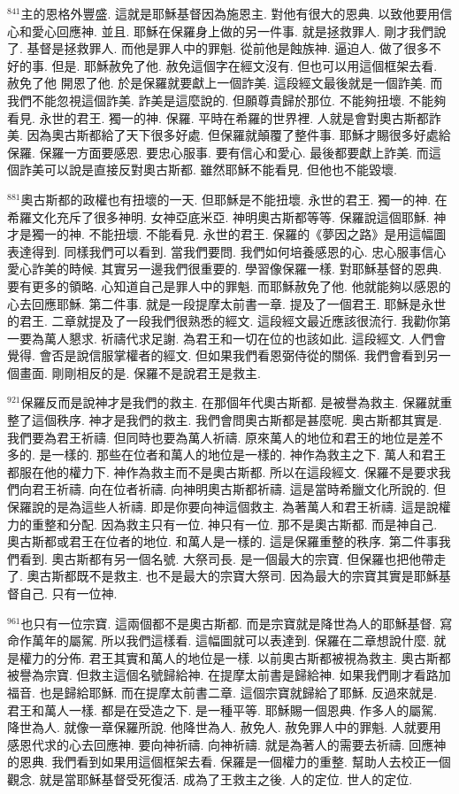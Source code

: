 \documentclass{book}
\begin{document}
$^{841}$主的恩格外豐盛.
這就是耶穌基督因為施恩主.
對他有很大的恩典.
以致他要用信心和愛心回應神.
並且.
耶穌在保羅身上做的另一件事.
就是拯救罪人.
剛才我們說了.
基督是拯救罪人.
而他是罪人中的罪魁.
從前他是蝕族神.
逼迫人.
做了很多不好的事.
但是.
耶穌赦免了他.
赦免這個字在經文沒有.
但也可以用這個框架去看.
赦免了他 開恩了他.
於是保羅就要獻上一個詐美.
這段經文最後就是一個詐美.
而我們不能忽視這個詐美.
詐美是這麼說的.
但願尊貴歸於那位.
不能夠扭壞.
不能夠看見.
永世的君王.
獨一的神.
保羅.
平時在希羅的世界裡.
人就是會對奧古斯都詐美.
因為奧古斯都給了天下很多好處.
但保羅就顛覆了整件事.
耶穌才賜很多好處給保羅.
保羅一方面要感恩.
要忠心服事.
要有信心和愛心.
最後都要獻上詐美.
而這個詐美可以說是直接反對奧古斯都.
雖然耶穌不能看見.
但他也不能毀壞.

$^{881}$奧古斯都的政權也有扭壞的一天.
但耶穌是不能扭壞.
永世的君王.
獨一的神.
在希羅文化充斥了很多神明.
女神亞底米亞.
神明奧古斯都等等.
保羅說這個耶穌.
神才是獨一的神.
不能扭壞.
不能看見.
永世的君王.
保羅的《夢因之路》是用這幅圖表達得到.
同樣我們可以看到.
當我們要問.
我們如何培養感恩的心.
忠心服事信心愛心詐美的時候.
其實另一邊我們很重要的.
學習像保羅一樣.
對耶穌基督的恩典.
要有更多的領略.
心知道自己是罪人中的罪魁.
而耶穌赦免了他.
他就能夠以感恩的心去回應耶穌.
第二件事.
就是一段提摩太前書一章.
提及了一個君王.
耶穌是永世的君王.
二章就提及了一段我們很熟悉的經文.
這段經文最近應該很流行.
我勸你第一要為萬人懇求.
祈禱代求足謝.
為君王和一切在位的也該如此.
這段經文.
人們會覺得.
會否是說信服掌權者的經文.
但如果我們看恩弼侍從的關係.
我們會看到另一個畫面.
剛剛相反的是.
保羅不是說君王是救主.

$^{921}$保羅反而是說神才是我們的救主.
在那個年代奧古斯都.
是被譽為救主.
保羅就重整了這個秩序.
神才是我們的救主.
我們會問奧古斯都是甚麼呢.
奧古斯都其實是.
我們要為君王祈禱.
但同時也要為萬人祈禱.
原來萬人的地位和君王的地位是差不多的.
是一樣的.
那些在位者和萬人的地位是一樣的.
神作為救主之下.
萬人和君王都服在他的權力下.
神作為救主而不是奧古斯都.
所以在這段經文.
保羅不是要求我們向君王祈禱.
向在位者祈禱.
向神明奧古斯都祈禱.
這是當時希臘文化所說的.
但保羅說的是為這些人祈禱.
即是你要向神這個救主.
為著萬人和君王祈禱.
這是說權力的重整和分配.
因為救主只有一位.
神只有一位.
那不是奧古斯都.
而是神自己.
奧古斯都或君王在位者的地位.
和萬人是一樣的.
這是保羅重整的秩序.
第二件事我們看到.
奧古斯都有另一個名號.
大祭司長.
是一個最大的宗寶.
但保羅也把他帶走了.
奧古斯都既不是救主.
也不是最大的宗寶大祭司.
因為最大的宗寶其實是耶穌基督自己.
只有一位神.

$^{961}$也只有一位宗寶.
這兩個都不是奧古斯都.
而是宗寶就是降世為人的耶穌基督.
寫命作萬年的屬駕.
所以我們這樣看.
這幅圖就可以表達到.
保羅在二章想說什麼.
就是權力的分佈.
君王其實和萬人的地位是一樣.
以前奧古斯都被視為救主.
奧古斯都被譽為宗寶.
但救主這個名號歸給神.
在提摩太前書是歸給神.
如果我們剛才看路加福音.
也是歸給耶穌.
而在提摩太前書二章.
這個宗寶就歸給了耶穌.
反過來就是.
君王和萬人一樣.
都是在受造之下.
是一種平等.
耶穌賜一個恩典.
作多人的屬駕.
降世為人.
就像一章保羅所說.
他降世為人.
赦免人.
赦免罪人中的罪魁.
人就要用感恩代求的心去回應神.
要向神祈禱.
向神祈禱.
就是為著人的需要去祈禱.
回應神的恩典.
我們看到如果用這個框架去看.
保羅是一個權力的重整.
幫助人去校正一個觀念.
就是當耶穌基督受死復活.
成為了王救主之後.
人的定位.
世人的定位.
\end{document}
